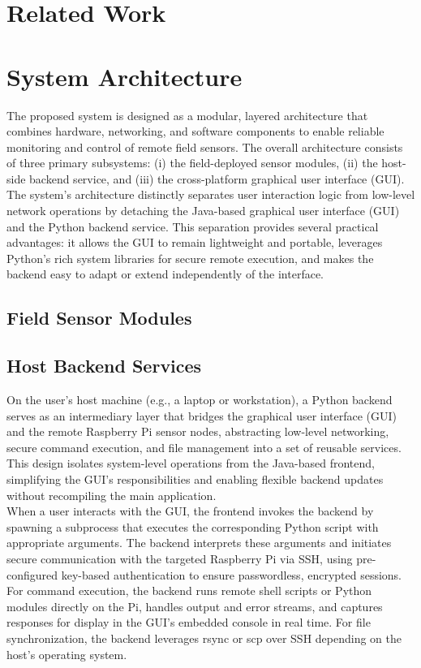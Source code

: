 \documentclass{article}
\begin{document}
\section{Related Work}

\section{System Architecture}
The proposed system is designed as a modular, layered architecture that combines hardware, networking, and software components to enable reliable monitoring and control of remote field sensors. The overall architecture consists of three primary subsystems: (i) the field-deployed sensor modules, (ii) the host-side backend service, and (iii) the cross-platform graphical user interface (GUI). The system’s architecture distinctly separates user interaction logic from low-level network operations by detaching the Java-based graphical user interface (GUI) and the Python backend service. This separation provides several practical advantages: it allows the GUI to remain lightweight and portable, leverages Python’s rich system libraries for secure remote execution, and makes the backend easy to adapt or extend independently of the interface.

\subsection{Field Sensor Modules}

\subsection{Host Backend Services}
On the user’s host machine (e.g., a laptop or workstation), a Python backend serves as an intermediary layer that bridges the graphical user interface (GUI) and the remote Raspberry Pi sensor nodes, abstracting low-level networking, secure command execution, and file management into a set of reusable services. This design isolates system-level operations from the Java-based frontend, simplifying the GUI’s responsibilities and enabling flexible backend updates without recompiling the main application.\\

When a user interacts with the GUI, the frontend invokes the backend by spawning a subprocess that executes the corresponding Python script with appropriate arguments. The backend interprets these arguments and initiates secure communication with the targeted Raspberry Pi via SSH, using pre-configured key-based authentication to ensure passwordless, encrypted sessions. For command execution, the backend runs remote shell scripts or Python modules directly on the Pi, handles output and error streams, and captures responses for display in the GUI’s embedded console in real time. For file synchronization, the backend leverages rsync or scp over SSH depending on the host's operating system.\\
\end{document}
